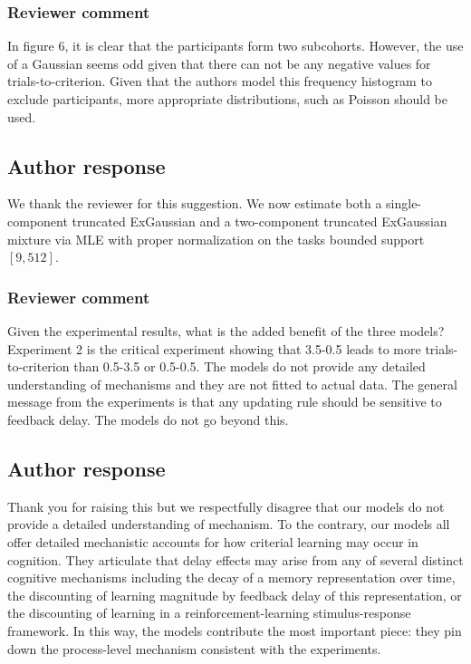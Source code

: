 \documentclass[12pt]{article}
\begin{document}
\subsubsection{Reviewer comment}
In figure 6, it is clear that the participants form two
subcohorts. However, the use of a Gaussian seems odd given
that there can not be any negative values for
trials-to-criterion. Given that the authors model this
frequency histogram to exclude participants, more
appropriate distributions, such as Poisson should be used.

\subsection{Author response}
We thank the reviewer for this suggestion. We now estimate
both a single-component truncated ExGaussian and a
two-component truncated ExGaussian mixture via MLE with
proper normalization on the tasks bounded support $[9,
512]$.

\subsubsection{Reviewer comment}
Given the experimental results, what is the added benefit of
the three models? Experiment 2 is the critical experiment
showing that 3.5-0.5 leads to more trials-to-criterion than
0.5-3.5 or 0.5-0.5. The models do not provide any detailed
understanding of mechanisms and they are not fitted to
actual data. The general message from the experiments is
that any updating rule should be sensitive to feedback
delay. The models do not go beyond this.

\subsection{Author response}
Thank you for raising this but we respectfully disagree that
our models do not provide a detailed understanding of
mechanism. To the contrary, our models all offer detailed
mechanistic accounts for how criterial learning may occur in
cognition. They articulate that delay effects may arise from
any of several distinct cognitive mechanisms including the
decay of a memory representation over time, the discounting
of learning magnitude by feedback delay of this
representation, or the discounting of learning in a
reinforcement-learning stimulus-response framework. In this
way, the models contribute the most important piece: they
pin down the process-level mechanism consistent with the
experiments.
\end{document}
